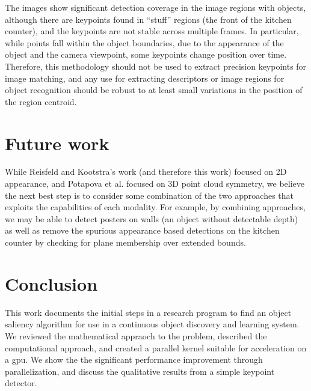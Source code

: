 The images show significant detection coverage in the image regions with objects, although there are keypoints found in ``stuff'' regions (\eg the front of the kitchen counter), and the keypoints are not stable across multiple frames. In particular, while points fall within the object boundaries, due to the appearance of the object and the camera viewpoint, some keypoints change position over time. Therefore, this methodology should not be used to extract precision keypoints for image matching, and any use for extracting descriptors or image regions for object recognition should be robust to at least small variations in the position of the region centroid.

\section{Future work}
\label{sec:future}

While Reisfeld and Kootstra's work (and therefore this work) focused on 2D appearance, and Potapova et al. focused on 3D point cloud symmetry, we believe the next best step is to consider some combination of the two approaches that exploits the capabilities of each modality. For example, by combining approaches, we may be able to detect posters on walls (an object without detectable depth) as well as remove the spurious appearance based detections on the kitchen counter by checking for plane membership over extended bounds. 

\section{Conclusion}
\label{sec:conclusion}

This work documents the initial steps in a research program to find an object saliency algorithm for use in a continuous object discovery and learning system. We reviewed the mathematical appraoch to the problem, described the computational approach, and created a parallel kernel suitable for acceleration on a \gls{gpu}. We show the the significant performance improvement through parallelization, and discuss the qualitative results from a simple keypoint detector. 




